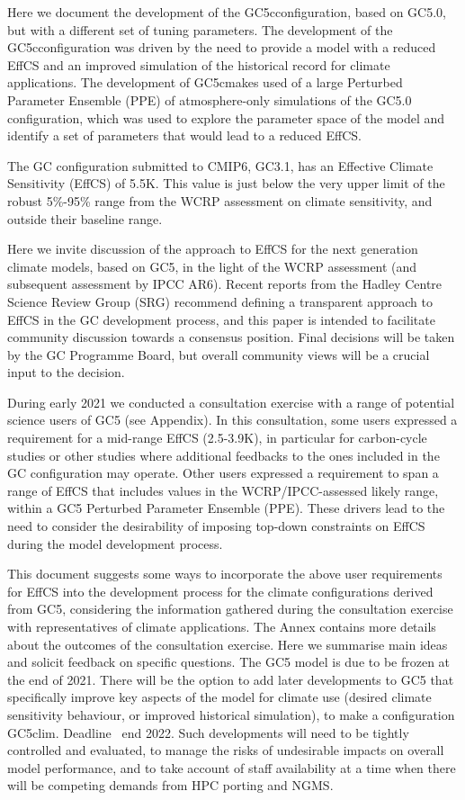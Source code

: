 \documentclass[gmd, manuscript]{copernicus}
\newcommand{\gcVc}{GC5c}
\begin{document}
Here we document the development of the \gcVc configuration, based on GC5.0, but with a different set of tuning parameters.
The development of the \gcVc configuration was driven by the need to provide a model with a reduced EffCS and an improved simulation of the historical record for climate applications.
The development of \gcVc makes used of a large Perturbed Parameter Ensemble (PPE) of atmosphere-only simulations of the GC5.0 configuration, which was used to explore the parameter space of the model and identify a set of parameters that would lead to a reduced EffCS.

The GC configuration submitted to CMIP6, GC3.1, has an Effective Climate Sensitivity (EffCS) of 5.5K.
This value is just below the very upper limit of the robust 5\%-95\% range from the WCRP assessment on climate sensitivity, and outside their baseline range.

Here we invite discussion of the approach to EffCS for the next generation climate models, based on GC5, in the light of the WCRP assessment (and subsequent assessment by IPCC AR6).
Recent reports from the Hadley Centre Science Review Group (SRG) recommend defining a transparent approach to EffCS in the GC development process, and this paper is intended to facilitate community discussion towards a consensus position.
Final decisions will be taken by the GC Programme Board, but overall community views will be a crucial input to the decision.

During early 2021 we conducted a consultation exercise with a range of potential science users of GC5 (see Appendix).
In this consultation, some users expressed a requirement for a mid-range EffCS (2.5-3.9K), in particular for carbon-cycle studies or other studies where additional feedbacks to the ones included in the GC configuration may operate.
Other users expressed a requirement to span a range of EffCS that includes values in the WCRP/IPCC-assessed likely range, within a GC5 Perturbed Parameter Ensemble (PPE).
These drivers lead to the need to consider the desirability of imposing top-down constraints on EffCS during the model development process.

This document suggests some ways to incorporate the above user requirements for EffCS into the development process for the climate configurations derived from GC5, considering the information gathered during the consultation exercise with representatives of climate applications.
The Annex contains more details about the outcomes of the consultation exercise.
Here we summarise main ideas and solicit feedback on specific questions.
The GC5 model is due to be frozen at the end of 2021. There will be the option to add later developments to GC5 that specifically improve key aspects of the model for climate use (desired climate sensitivity behaviour, or improved historical simulation), to make a configuration GC5clim.
Deadline ~end 2022.
Such developments will need to be tightly controlled and evaluated, to manage the risks of undesirable impacts on overall model performance, and to take account of staff availability at a time when there will be competing demands from HPC porting and NGMS.
\end{document}

